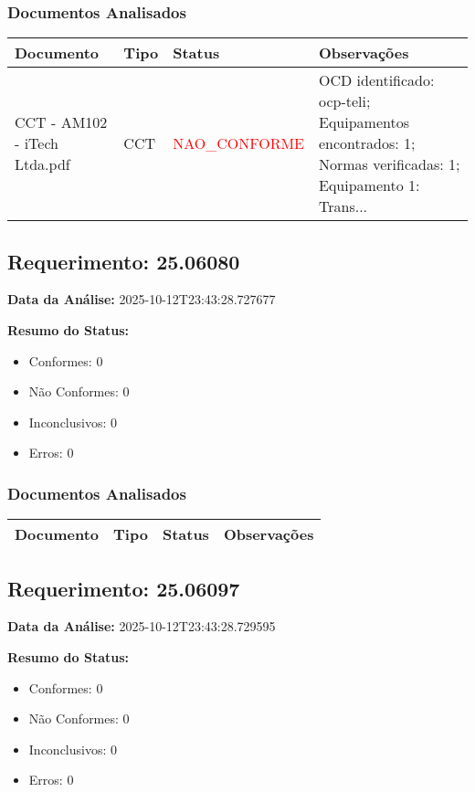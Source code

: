 \documentclass[12pt,a4paper]{article}
\begin{document}
\subsubsection{Documentos Analisados}

\begin{longtable}{|p{4cm}|p{2cm}|p{2cm}|p{6cm}|}
\hline
\textbf{Documento} & \textbf{Tipo} & \textbf{Status} & \textbf{Observações} \\
\hline
\endhead
CCT - AM102 - iTech Ltda.pdf & CCT & \textcolor{red}{NAO\_CONFORME} & OCD identificado: ocp-teli; Equipamentos encontrados: 1; Normas verificadas: 1; Equipamento 1: Trans... \\
\hline
\end{longtable}


\subsection{Requerimento: 25.06080}

\textbf{Data da Análise:} 2025-10-12T23:43:28.727677

\textbf{Resumo do Status:}
\begin{itemize}
    \item Conformes: 0
    \item Não Conformes: 0
    \item Inconclusivos: 0
    \item Erros: 0
\end{itemize}

\subsubsection{Documentos Analisados}

\begin{longtable}{|p{4cm}|p{2cm}|p{2cm}|p{6cm}|}
\hline
\textbf{Documento} & \textbf{Tipo} & \textbf{Status} & \textbf{Observações} \\
\hline
\endhead
\end{longtable}


\subsection{Requerimento: 25.06097}

\textbf{Data da Análise:} 2025-10-12T23:43:28.729595

\textbf{Resumo do Status:}
\begin{itemize}
    \item Conformes: 0
    \item Não Conformes: 0
    \item Inconclusivos: 0
    \item Erros: 0
\end{itemize}
\end{document}

